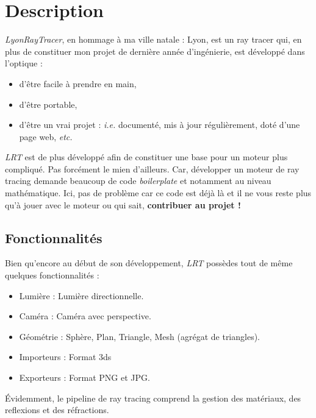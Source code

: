 \section{Description}
\textsl{LyonRayTracer}, en hommage à ma ville natale : Lyon, est un ray tracer
qui, en plus de constituer mon projet de dernière année d'ingénierie, est
développé dans l'optique :
\begin{itemize}
  \item d'être facile à prendre en main,
  \item d'être portable,
  \item d'être un vrai projet : \textsl{i.e.} documenté, mis à jour
  régulièrement, doté d'une page web, \textsl{etc.}
\end{itemize}

\textsl{LRT} est de plus développé afin de constituer une base pour un moteur plus
compliqué. Pas forcément le mien d'ailleurs. Car, développer un moteur de ray tracing demande beaucoup de
code \textsl{boilerplate} et notamment au niveau mathématique. Ici, pas de
problème car ce code est déjà là et il ne vous reste plus qu'à jouer avec le
moteur ou qui sait, \textbf{contribuer au projet !}

\subsection{Fonctionnalités}
Bien qu'encore au début de son développement, \textsl{LRT} possèdes tout de même
quelques fonctionnalités :
\begin{itemize}
  \item Lumière : Lumière directionnelle.
  \item Caméra : Caméra avec perspective.
  \item Géométrie : Sphère, Plan, Triangle, Mesh (agrégat de triangles).
  \item Importeurs : Format 3ds
  \item Exporteurs : Format PNG et JPG.
\end{itemize}

Évidemment, le pipeline de ray tracing comprend la gestion des matériaux, des
reflexions et des réfractions.
